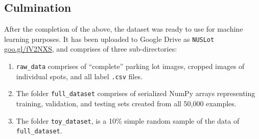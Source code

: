 \documentclass[a4paper, 11pt]{article} %
\begin{document}
	\subsection{Culmination}
		After the completion of the above, the dataset was ready to use for machine learning purposes. It
		has been uploaded to Google Drive as \texttt{NUSLot}
		\hyperlink{https://goo.gl/fV2NXS}{goo.gl/fV2NXS}, and comprises of 
		three sub-directories:
		\begin{enumerate}
			\item \texttt{raw\_data} comprises of ``complete'' parking lot images, cropped images of
			individual spots, and all label \texttt{.csv} files.
			\item The folder \texttt{full\_dataset} comprises of serialized NumPy arrays representing
			training, validation, and testing sets created from all 50,000 examples. 
			\item The folder \texttt{toy\_dataset}, is a 10\% simple random sample of the data of
			\texttt{full\_dataset}.
		\end{enumerate}
\end{document}
